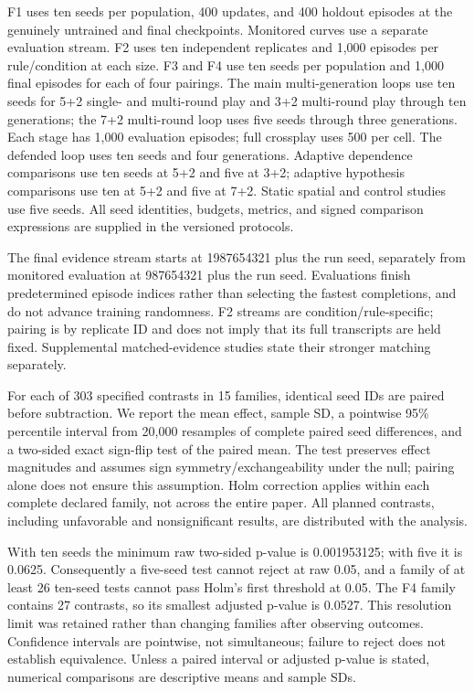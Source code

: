 \documentclass[
  12pt,
]{article}
\begin{document}
F1 uses ten seeds per population, 400 updates, and 400 holdout episodes
at the genuinely untrained and final checkpoints. Monitored curves use a
separate evaluation stream. F2 uses ten independent replicates and 1,000
episodes per rule/condition at each size. F3 and F4 use ten seeds per
population and 1,000 final episodes for each of four pairings. The main
multi-generation loops use ten seeds for 5+2 single- and multi-round
play and 3+2 multi-round play through ten generations; the 7+2
multi-round loop uses five seeds through three generations. Each stage
has 1,000 evaluation episodes; full crossplay uses 500 per cell. The
defended loop uses ten seeds and four generations. Adaptive dependence
comparisons use ten seeds at 5+2 and five at 3+2; adaptive hypothesis
comparisons use ten at 5+2 and five at 7+2. Static spatial and control
studies use five seeds. All seed identities, budgets, metrics, and
signed comparison expressions are supplied in the versioned protocols.

The final evidence stream starts at 1987654321 plus the run seed,
separately from monitored evaluation at 987654321 plus the run seed.
Evaluations finish predetermined episode indices rather than selecting
the fastest completions, and do not advance training randomness. F2
streams are condition/rule-specific; pairing is by replicate ID and does
not imply that its full transcripts are held fixed. Supplemental
matched-evidence studies state their stronger matching separately.

For each of 303 specified contrasts in 15 families, identical seed IDs
are paired before subtraction. We report the mean effect, sample SD, a
pointwise 95\% percentile interval from 20,000 resamples of complete
paired seed differences, and a two-sided exact sign-flip test of the
paired mean. The test preserves effect magnitudes and assumes sign
symmetry/exchangeability under the null; pairing alone does not ensure
this assumption. Holm correction applies within each complete declared
family, not across the entire paper. All planned contrasts, including
unfavorable and nonsignificant results, are distributed with the
analysis.

With ten seeds the minimum raw two-sided p-value is 0.001953125; with
five it is 0.0625. Consequently a five-seed test cannot reject at raw
0.05, and a family of at least 26 ten-seed tests cannot pass Holm's
first threshold at 0.05. The F4 family contains 27 contrasts, so its
smallest adjusted p-value is 0.0527. This resolution limit was retained
rather than changing families after observing outcomes. Confidence
intervals are pointwise, not simultaneous; failure to reject does not
establish equivalence. Unless a paired interval or adjusted p-value is
stated, numerical comparisons are descriptive means and sample SDs.
\end{document}
